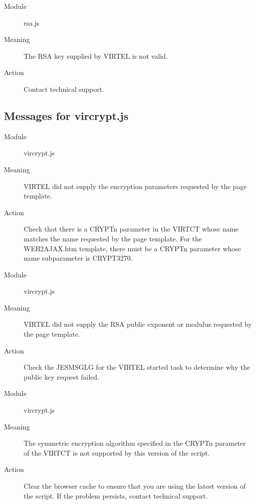 \documentclass[letterpaper,10pt,english]{sphinxmanual}
\begin{document}
\begin{description}
\item[{Module}] \leavevmode
rsa.js

\item[{Meaning}] \leavevmode
The RSA key supplied by VIRTEL is not valid.

\item[{Action}] \leavevmode
Contact technical support.

\end{description}


\subsection{Messages for vircrypt.js}
\label{\detokenize{messages:messages-for-vircrypt-js}}
\begin{description}
\item[{Module}] \leavevmode
vircrypt.js

\item[{Meaning}] \leavevmode
VIRTEL did not supply the encryption parameters requested by the page template.

\item[{Action}] \leavevmode
Check that there is a CRYPTn parameter in the VIRTCT whose name matches the name requested by the page template. For the WEB2AJAX.htm template, there must be a CRYPTn parameter whose name subparameter is CRYPT3270.

\end{description}

\begin{description}
\item[{Module}] \leavevmode
vircrypt.js

\item[{Meaning}] \leavevmode
VIRTEL did not supply the RSA public exponent or modulus requested by the page template.

\item[{Action}] \leavevmode
Check the JESMSGLG for the VIRTEL started task to determine why the public key request failed.

\end{description}

\begin{description}
\item[{Module}] \leavevmode
vircrypt.js

\item[{Meaning}] \leavevmode
The symmetric encryption algorithm specified in the CRYPTn parameter of the VIRTCT is not supported by this version of the script.

\item[{Action}] \leavevmode
Clear the browser cache to ensure that you are using the latest version of the script. If the problem persists, contact technical support.

\end{description}
\end{document}
